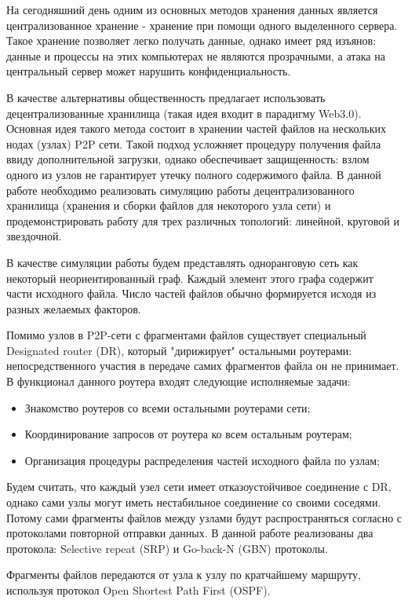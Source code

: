 На сегодняшний день одним из основных методов хранения данных является централизованное хранение - хранение при помощи одного выделенного сервера. Такое хранение позволяет легко получать данные, однако имеет ряд изъянов: данные и процессы на этих компьютерах не являются прозрачными, а атака на центральный сервер может нарушить конфиденциальность.

В качестве альтернативы общественность предлагает использовать децентрализованные хранилища (такая идея входит в парадигму Web3.0). Основная идея такого метода состоит в хранении частей файлов на нескольких нодах (узлах) P2P сети. Такой подход усложняет процедуру получения файла ввиду дополнительной загрузки, однако обеспечивает защищенность: взлом одного из узлов не гарантирует утечку полного содержимого файла. В данной работе необходимо реализовать симуляцию работы децентрализованного хранилища (хранения и сборки файлов для некоторого узла сети) и продемонстрировать работу для трех различных топологий: линейной, круговой и звездочной.

В качестве симуляции работы будем представлять одноранговую сеть как некоторый неориентированный граф. Каждый элемент этого графа содержит части исходного файла. Число частей файлов обычно формируется исходя из разных желаемых факторов. 

Помимо узлов в P2P-сети с фрагментами файлов существует специальный Designated router (DR), который "дирижирует" остальными роутерами: непосредственного участия в передаче самих фрагментов файла он не принимает. В функционал данного роутера входят следующие исполняемые задачи:
\begin{itemize}
    \item Знакомство роутеров со всеми остальными роутерами сети;
    \item Координирование запросов от роутера ко всем остальным роутерам;
    \item Организация процедуры распределения частей исходного файла по узлам;
\end{itemize}
Будем считать, что каждый узел сети имеет отказоустойчивое соединение с DR, однако сами узлы могут иметь нестабильное соединение со своими соседями. Потому сами фрагменты файлов между узлами будут распространяться согласно с протоколами повторной отправки данных. В данной работе реализованы два протокола: Selective repeat (SRP) и Go-back-N (GBN) протоколы. 

Фрагменты файлов передаются от узла к узлу по кратчайшему маршруту, используя протокол Open Shortest Path First (OSPF). 

